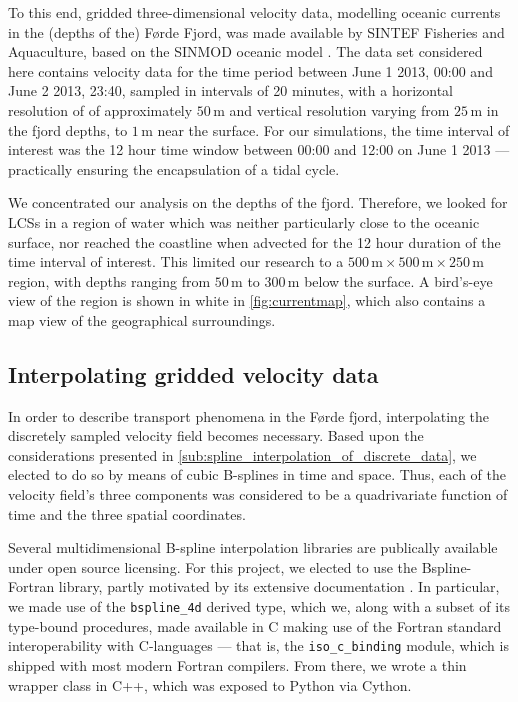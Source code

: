 To this end, gridded three-dimensional velocity data, modelling oceanic
currents in the (depths of the) Førde Fjord, was made available by SINTEF
Fisheries and Aquaculture, based on the SINMOD oceanic model
\parencite{slagstad2005modeling}. The data set considered here contains velocity
data for the time period between June 1 2013, 00:00 and June 2 2013, 23:40,
sampled in intervals of 20 minutes, with a horizontal resolution of
of approximately $50\,\si{\meter}$ and vertical resolution varying from
$25\,\si{\meter}$ in the fjord depths, to $1\,\si{\meter}$ near the surface.
For our simulations, the time interval of interest was the 12 hour time window
between 00:00 and 12:00 on June 1 2013 --- practically ensuring the
encapsulation of a tidal cycle.

We concentrated our analysis on the depths of the fjord. Therefore, we looked
for LCSs in a region of water which was neither particularly close to the
oceanic surface, nor reached the coastline when advected for the 12 hour
duration of the time interval of interest. This limited our research to a
$500\,\si{\meter}\times500\,\si{\meter}\times250\,\si{\meter}$ region, with
depths ranging from $50\,\si{\meter}$ to $300\,\si{\meter}$ below the
surface. A bird's-eye view of the region is shown in white in
\cref{fig:currentmap}, which also contains a map view of the geographical
surroundings.



\subsection{Interpolating gridded velocity data}
\label{sub:interpolating_gridded_velocity_data}

In order to describe transport phenomena in the Førde fjord, interpolating
the discretely sampled velocity field becomes necessary. Based upon the
considerations presented in \cref{sub:spline_interpolation_of_discrete_data},
we elected to do so by means of cubic B-splines in time and space. Thus,
each of the velocity field's three components was considered to be a
quadrivariate function of time and the three spatial coordinates.

Several multidimensional B-spline interpolation libraries are publically
available under open source licensing. For this project, we elected to use
the Bspline-Fortran library, partly motivated by its extensive documentation
\parencite{williams2018bspline}. In particular, we made use of the
\texttt{bspline\_4d} derived type, which we, along with a subset of its
type-bound procedures, made available in C making use of the Fortran standard
interoperability with C-languages --- that is, the \texttt{iso\_c\_binding}
module, which is shipped with most modern Fortran compilers. From there,
we wrote a thin wrapper class in C++, which was exposed to Python via Cython.


